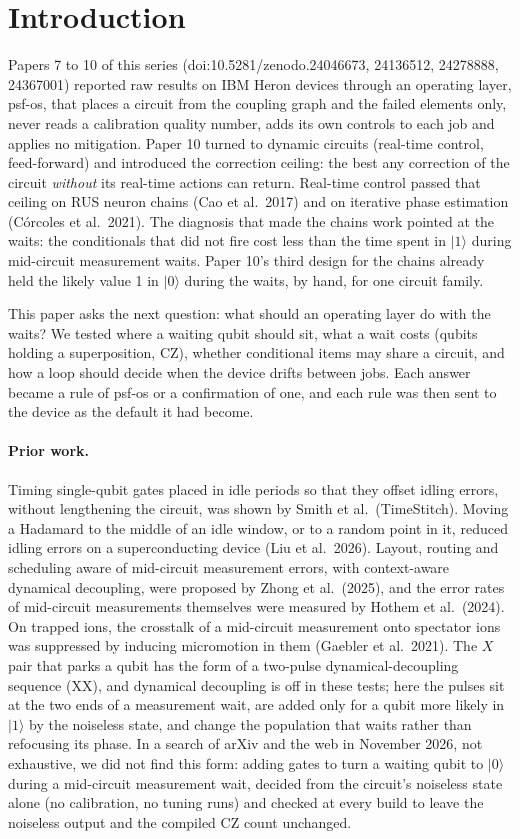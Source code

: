 \documentclass[10pt,a4paper]{article}
\newcommand{\ket}[1]{|#1\rangle}
\begin{document}
\section{Introduction}\label{sec:intro}
Papers 7 to 10 of this series (doi:10.5281/zenodo.24046673, 24136512, 24278888, 24367001) reported raw results on IBM
Heron devices through an operating layer, psf-os, that places a circuit from the coupling graph and the failed
elements only, never reads a calibration quality number, adds its own controls to each job and applies no mitigation.
Paper 10 turned to dynamic circuits (real-time control, feed-forward) and introduced the correction ceiling: the best
any correction of the circuit \emph{without} its real-time actions can return. Real-time control passed that ceiling
on RUS neuron chains (Cao et al.\ 2017) and on iterative phase estimation (C\'orcoles et al.\ 2021). The diagnosis that made the chains work pointed at the waits:
the conditionals that did not fire cost less than the time spent in $\ket{1}$ during mid-circuit measurement waits. Paper 10's third design for the chains already held the likely value 1 in $\ket{0}$ during the waits, by
hand, for one circuit family.

This paper asks the next question: what should an operating layer do with the waits? We tested where a waiting qubit
should sit, what a wait costs (qubits holding a superposition, CZ), whether conditional items may share a circuit, and
how a loop should decide when the device drifts between jobs. Each answer became a rule of psf-os or a confirmation of
one, and each rule was then sent to the device as the default it had become.

\paragraph{Prior work.} Timing single-qubit gates placed in idle periods so that they offset idling errors, without
lengthening the circuit, was shown by Smith et al.\ (TimeStitch). Moving a Hadamard to the middle of an idle
window, or to a random point in it, reduced idling errors on a superconducting device (Liu et al.\ 2026). Layout,
routing and scheduling aware of mid-circuit measurement errors, with context-aware dynamical decoupling, were proposed
by Zhong et al.\ (2025), and the error rates of mid-circuit measurements themselves were measured by Hothem et
al.\ (2024). On trapped ions, the crosstalk of a mid-circuit measurement onto spectator ions was suppressed by
inducing micromotion in them (Gaebler et al.\ 2021). The $X$ pair that parks a qubit has the form of a two-pulse
dynamical-decoupling sequence (XX), and dynamical decoupling is off in these tests; here the pulses sit at the two ends
of a measurement wait, are added only for a qubit more likely in $\ket{1}$ by the noiseless state, and change the
population that waits rather than refocusing its phase. In a search of arXiv and the web in November 2026, not
exhaustive, we did not find this form: adding gates to turn a waiting qubit to $\ket{0}$ during a mid-circuit measurement wait,
decided from the circuit's noiseless state alone (no calibration, no tuning runs) and checked at every build to leave
the noiseless output and the compiled CZ count unchanged.
\end{document}
